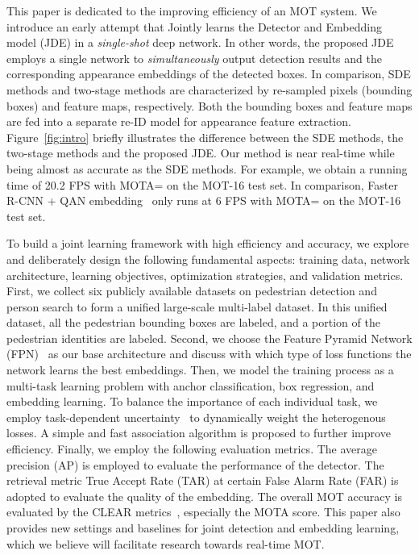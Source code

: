 \documentclass[runningheads]{llncs}
\begin{document}
This paper is dedicated to the improving efficiency of an MOT system. We introduce an early attempt that Jointly learns the Detector and Embedding model (JDE) in a \emph{single-shot} deep network. In other words, the proposed JDE employs a single network to \emph{simultaneously} output detection results and the corresponding appearance embeddings of the detected boxes. In comparison, SDE methods and two-stage methods are characterized by re-sampled pixels (bounding boxes) and feature maps, respectively. Both the bounding boxes and feature maps are fed into a separate re-ID model for appearance feature extraction. Figure~\ref{fig:intro} briefly illustrates the difference between the SDE methods, the two-stage methods and the proposed JDE. Our method is near real-time while being  almost as accurate as the SDE methods. For example, we obtain a running time of 20.2 FPS with MOTA= on the MOT-16 test set. In comparison, Faster R-CNN + QAN embedding~\cite{poi} only runs at 6 FPS with MOTA= on the MOT-16 test set. 



To build a joint learning framework with high efficiency and accuracy, we explore and deliberately design the following fundamental aspects:  training data, network architecture,  learning objectives, optimization strategies, and validation metrics.
First, we collect six publicly available datasets on pedestrian detection and person search to form a unified large-scale multi-label dataset. In this unified dataset, all the pedestrian bounding boxes are labeled, and a portion of the pedestrian identities are labeled. Second, we choose the Feature Pyramid Network (FPN)~\cite{fpn} as our base architecture and discuss with which type of loss functions the network learns the best embeddings. Then, we model the training process as a multi-task learning problem with anchor classification, box regression, and embedding learning. To balance the importance of each individual task, we employ task-dependent uncertainty~\cite{uncertainty} to dynamically weight the heterogenous losses.
A simple and fast association algorithm is proposed to further improve efficiency. 
Finally, we employ the following evaluation metrics. The average precision (AP) is employed to evaluate the performance of the detector. The retrieval metric True Accept Rate (TAR) at certain False Alarm Rate (FAR) is adopted to evaluate the quality of the embedding. The overall MOT accuracy is evaluated by the CLEAR metrics~\cite{CLEAR}, especially the MOTA score. This paper also provides  new settings and baselines for  joint detection and embedding learning, which we believe will facilitate research towards real-time MOT. 
\end{document}
